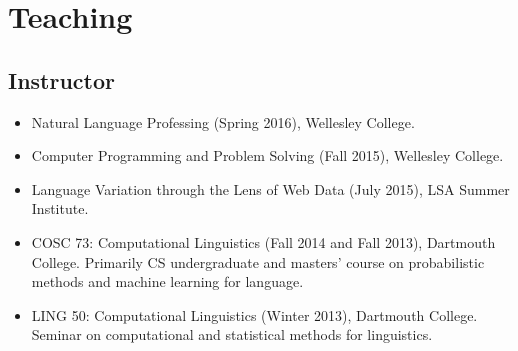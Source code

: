 \documentclass[10.5pt,letterpaper]{article}
\begin{document}
%

\section*{Teaching}

\subsection*{Instructor}

\begin{itemize}
\item Natural Language Professing (Spring 2016), Wellesley College.
\item Computer Programming and Problem Solving (Fall 2015), Wellesley College.
\item Language Variation through the Lens of Web Data (July 2015), LSA Summer Institute. 
\item COSC 73: Computational Linguistics (Fall 2014 and Fall 2013), Dartmouth College. Primarily CS undergraduate and masters' course on probabilistic methods and machine learning for language.
\item LING 50: Computational Linguistics (Winter 2013), Dartmouth College. Seminar on computational and statistical methods for linguistics.
\end{itemize}

\end{document}
